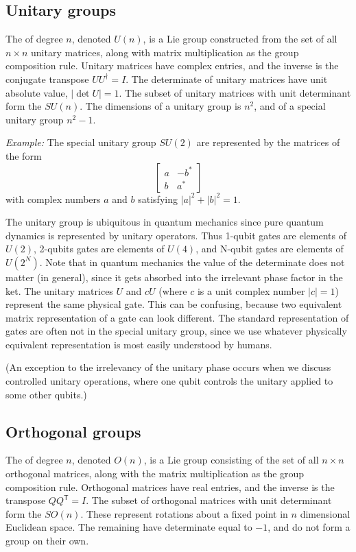 \subsection{Unitary groups}
The  of degree $n$, denoted $U(n)$, is a Lie group constructed from the set of all $n\times n$ unitary matrices, along with  matrix multiplication as the group composition rule. Unitary matrices have complex entries, and the inverse is the conjugate transpose $UU^\dagger=I$. The determinate of unitary matrices have unit absolute value, $|\det U|=1$. The subset of unitary matrices with unit determinant form the  $SU(n)$. The dimensions of a unitary group is $n^2$, and of a special unitary group $n^2-1$.



{\sl Example:} The special unitary group $SU(2)$ are represented by the matrices of the form
\[
\begin{bmatrix}
a & -b^* \\
b & a^*
\end{bmatrix}
\]
with complex numbers $a$ and $b$ satisfying $|a|^2 + |b|^2 = 1$.

The unitary group is ubiquitous in quantum mechanics since pure quantum dynamics is represented by unitary operators. Thus 1-qubit gates are elements of $U(2)$, 2-qubits gates are elements of $U(4)$, and N-qubit gates are elements of $U(2^N)$. Note that in quantum mechanics the value of the determinate does not matter (in general), since it gets absorbed into the irrelevant phase factor in the ket. The unitary matrices $U$ and $cU$ (where $c$ is a unit complex number $|c|=1$) represent the same physical gate. This can be confusing, because two equivalent matrix representation of a gate can look different. The standard representation of gates are often not in the special unitary group, since we use whatever physically equivalent representation is most easily understood by humans.

(An exception to the irrelevancy of the unitary phase occurs when we discuss controlled unitary operations, where one qubit controls the unitary applied to some other qubits.)


\newcommand{\T}{\mathsf{T}}

\subsection{Orthogonal groups}
The  of degree $n$, denoted $O(n)$, is a Lie group consisting of the set of all $n\times n$ orthogonal matrices, along with the matrix multiplication as the group composition rule. Orthogonal matrices have real entries, and the inverse is the transpose $QQ^\T=I$. The subset of orthogonal matrices with unit determinant form the  $SO(n)$. These represent rotations about a fixed point in $n$ dimensional Euclidean space. The remaining  have determinate equal to $-1$, and do not form a group on their own.

